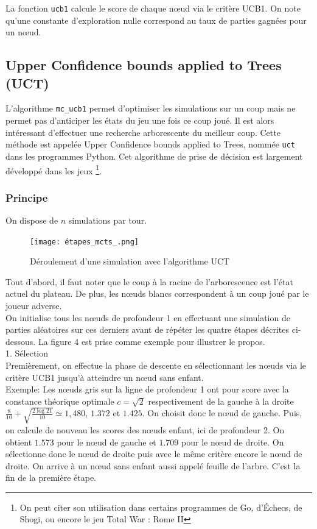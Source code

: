 \documentclass[a4paper]{article}
\theoremstyle{definition}
\begin{document}
La fonction \texttt{ucb1} calcule le score de chaque nœud via le critère UCB1. On note qu'une constante d'exploration nulle correspond au taux de parties gagnées pour un nœud.

\subsection{Upper Confidence bounds applied to Trees (UCT)}

L'algorithme \texttt{mc\_ucb1} permet d'optimiser les simulations sur un coup mais ne permet pas d'anticiper les états du jeu une fois ce coup joué. Il est alors intéressant d'effectuer une recherche arborescente du meilleur coup. Cette méthode est appelée Upper Confidence bounds applied to Trees, nommée \texttt{uct} dans les programmes Python. Cet algorithme de prise de décision est largement développé dans les jeux \footnote{On peut citer son utilisation dans certains programmes de Go, d'Échecs, de Shogi, ou encore le jeu Total War : Rome II}.

\subsubsection{Principe}

On dispose de $n$ simulations par tour.
\begin{figure}[h]
\centering
\texttt{[image: étapes\_mcts\_.png]}
\caption{Déroulement d'une simulation avec l'algorithme UCT}
\label{fig:uct}
\end{figure}

Tout d'abord, il faut noter que le coup à la racine de l'arborescence est l'état actuel du plateau. De plus, les nœuds blancs correspondent à un coup joué par le joueur adverse.\\
On initialise tous les nœuds de profondeur 1 en effectuant une simulation de parties aléatoires sur ces derniers avant de répéter les quatre étapes décrites ci-dessous. La figure 4 est prise comme exemple pour illustrer le propos.\\

1. Sélection\\
Premièrement, on effectue la phase de descente en sélectionnant les nœuds via le critère UCB1 jusqu'à atteindre un nœud sans enfant.\\
Exemple: Les nœuds gris sur la ligne de profondeur 1 ont pour score avec la constance théorique optimale $c=\sqrt{2}$ respectivement de la gauche à la droite $\frac{8}{10} + \sqrt{\frac{2\log21}{10}} \simeq 1,480$, $1.372$ et $1.425$. On choisit donc le nœud de gauche. Puis, on calcule de nouveau les scores des nœuds enfant, ici de profondeur 2. On obtient $1.573$ pour le nœud de gauche et $1.709$ pour le nœud de droite. On sélectionne donc le nœud de droite puis avec le même critère encore le nœud de droite. On arrive à un nœud sans enfant aussi appelé feuille de l'arbre. C'est la fin de la première étape.
\\
\end{document}
